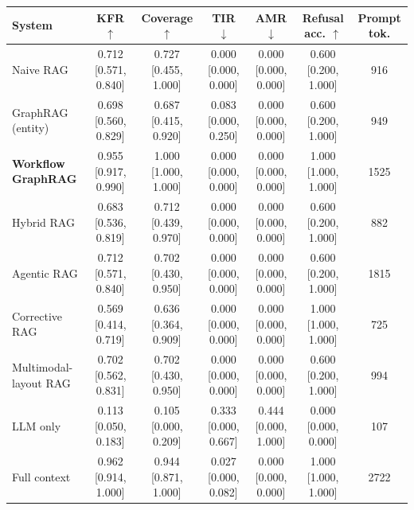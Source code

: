 \begin{tabular}{lcccccc}
\toprule
System & KFR $\uparrow$ & Coverage $\uparrow$ & TIR $\downarrow$ & AMR $\downarrow$ & Refusal acc. $\uparrow$ & Prompt tok. \\
\midrule
Naive RAG & 0.712 [0.571, 0.840] & 0.727 [0.455, 1.000] & 0.000 [0.000, 0.000] & 0.000 [0.000, 0.000] & 0.600 [0.200, 1.000] & 916 \\
GraphRAG (entity) & 0.698 [0.560, 0.829] & 0.687 [0.415, 0.920] & 0.083 [0.000, 0.250] & 0.000 [0.000, 0.000] & 0.600 [0.200, 1.000] & 949 \\
\textbf{Workflow GraphRAG} & 0.955 [0.917, 0.990] & 1.000 [1.000, 1.000] & 0.000 [0.000, 0.000] & 0.000 [0.000, 0.000] & 1.000 [1.000, 1.000] & 1525 \\
\midrule
Hybrid RAG & 0.683 [0.536, 0.819] & 0.712 [0.439, 0.970] & 0.000 [0.000, 0.000] & 0.000 [0.000, 0.000] & 0.600 [0.200, 1.000] & 882 \\
Agentic RAG & 0.712 [0.571, 0.840] & 0.702 [0.430, 0.950] & 0.000 [0.000, 0.000] & 0.000 [0.000, 0.000] & 0.600 [0.200, 1.000] & 1815 \\
Corrective RAG & 0.569 [0.414, 0.719] & 0.636 [0.364, 0.909] & 0.000 [0.000, 0.000] & 0.000 [0.000, 0.000] & 1.000 [1.000, 1.000] & 725 \\
Multimodal-layout RAG & 0.702 [0.562, 0.831] & 0.702 [0.430, 0.950] & 0.000 [0.000, 0.000] & 0.000 [0.000, 0.000] & 0.600 [0.200, 1.000] & 994 \\
\midrule
LLM only & 0.113 [0.050, 0.183] & 0.105 [0.000, 0.209] & 0.333 [0.000, 0.667] & 0.444 [0.000, 1.000] & 0.000 [0.000, 0.000] & 107 \\
Full context & 0.962 [0.914, 1.000] & 0.944 [0.871, 1.000] & 0.027 [0.000, 0.082] & 0.000 [0.000, 0.000] & 1.000 [1.000, 1.000] & 2722 \\
\bottomrule
\end{tabular}
